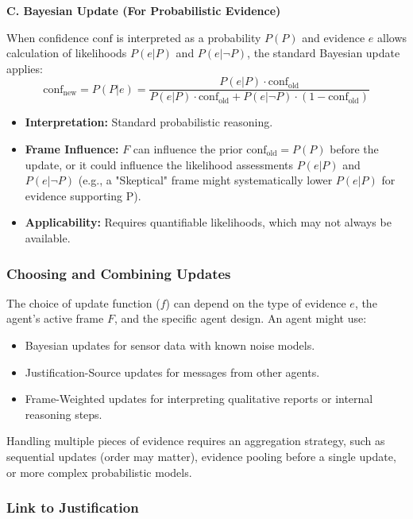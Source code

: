 \documentclass[10pt,a4paper]{article}
\begin{document}
\textbf{C. Bayesian Update (For Probabilistic Evidence)}

When confidence $\mathrm{conf}$ is interpreted as a probability $P(P)$ and evidence $e$ allows calculation of likelihoods $P(e|P)$ and $P(e|\neg P)$, the standard Bayesian update applies:
\begin{equation}
\label{eq:bayesian}
\mathrm{conf}_{\mathrm{new}} = P(P | e) = \frac{P(e | P) \cdot \mathrm{conf}_{\mathrm{old}}}{P(e | P) \cdot \mathrm{conf}_{\mathrm{old}} + P(e | \neg P) \cdot (1 - \mathrm{conf}_{\mathrm{old}})}
\end{equation}
\begin{itemize}
    \item \textbf{Interpretation:} Standard probabilistic reasoning.
    \item \textbf{Frame Influence:} $F$ can influence the prior $\mathrm{conf}_{\mathrm{old}} = P(P)$ before the update, or it could influence the likelihood assessments $P(e | P)$ and $P(e | \neg P)$ (e.g., a "Skeptical" frame might systematically lower $P(e | P)$ for evidence supporting P).
    \item \textbf{Applicability:} Requires quantifiable likelihoods, which may not always be available.
\end{itemize}

\subsubsection{Choosing and Combining Updates}

The choice of update function ($f$) can depend on the type of evidence $e$, the agent's active frame $F$, and the specific agent design. An agent might use:
\begin{itemize}
    \item Bayesian updates for sensor data with known noise models.
    \item Justification-Source updates for messages from other agents.
    \item Frame-Weighted updates for interpreting qualitative reports or internal reasoning steps.
\end{itemize}
Handling multiple pieces of evidence requires an aggregation strategy, such as sequential updates (order may matter), evidence pooling before a single update, or more complex probabilistic models.

\subsubsection{Link to Justification}
\end{document}
